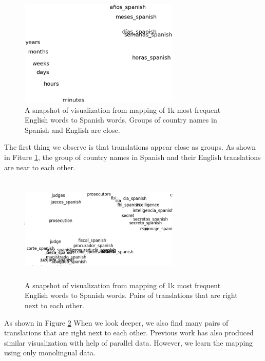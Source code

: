 
 \begin{figure}[!ht]
  \centering
  \includegraphics[width=3.0in,height=2.0in]{time}
  \caption{A snapshot of visualization from mapping of 1k most frequent English words to Spanish words. Groups of country names in Spanish and English are close.}
\label{viz_countries}
\end{figure}

The first thing we observe is that translations appear close as groups. As shown in 
Fiture \ref{viz_countries}, the group of country names in Spanish and their English translations are near to each other.


 \begin{figure}[!ht]
  \centering
  \includegraphics[width=3.0in,height=2.0in]{magistrado}
  \caption{A snapshot of visualization from mapping of 1k most frequent English words to Spanish words. Pairs of translations that are right next to each other.}
\label{viz_close}
\end{figure}

As shown in Figure \ref{viz_close} When we look deeper, we also find many pairs of translations that are right next to each other. Previous work has also produced similar visualization with help of parallel data. However, we learn the mapping using only monolingual data.
